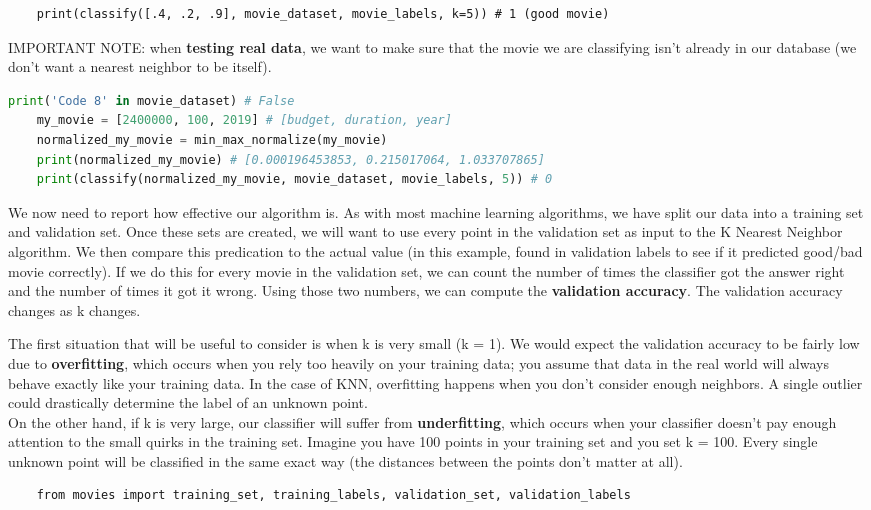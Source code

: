 \documentclass[11pt, a4paper]{article}
\begin{document}
\begin{spacing}{1.1}
\begin{lstlisting}
	print(classify([.4, .2, .9], movie_dataset, movie_labels, k=5)) # 1 (good movie) \end{lstlisting}\vspace*{1mm}
	IMPORTANT NOTE: when \textbf{testing real data}, we want to make sure that the movie we are classifying isn't already in our database (we don't want a nearest neighbor to be itself). 
	\begin{lstlisting}[language=Python]
	print('Code 8' in movie_dataset) # False
	my_movie = [2400000, 100, 2019] # [budget, duration, year]
	normalized_my_movie = min_max_normalize(my_movie)
	print(normalized_my_movie) # [0.000196453853, 0.215017064, 1.033707865]
	print(classify(normalized_my_movie, movie_dataset, movie_labels, 5)) # 0 \end{lstlisting}\vspace*{1mm}
	We now need to report how effective our algorithm is. As with most machine learning algorithms, we have split our data into a training set and validation set. Once these sets are created, we will want to use every point in the validation set as input to the K Nearest Neighbor algorithm. We then compare this predication to the actual value (in this example, found in validation labels to see if it predicted good/bad movie correctly).  If we do this for every movie in the validation set, we can count the number of times the classifier got the answer right and the number of times it got it wrong. Using those two numbers, we can compute the \textbf{validation accuracy}. The validation accuracy changes as k changes. \newpage

	\noindent The first situation that will be useful to consider is when k is very small (k = 1). We would expect the validation accuracy to be fairly low due to \textbf{overfitting}, which occurs when you rely too heavily on your training data; you assume that data in the real world will always behave exactly like your training data. In the case of KNN, overfitting happens when you don’t consider enough neighbors. A single outlier could drastically determine the label of an unknown point. \vspace*{2mm} \\
	On the other hand, if k is very large, our classifier will suffer from \textbf{underfitting}, which occurs when your classifier doesn’t pay enough attention to the small quirks in the training set. Imagine you have 100 points in your training set and you set k = 100. Every single unknown point will be classified in the same exact way (the distances between the points don’t matter at all). 
	\begin{lstlisting}
	from movies import training_set, training_labels, validation_set, validation_labels
	

\end{lstlisting}
\end{spacing}
\end{document}
